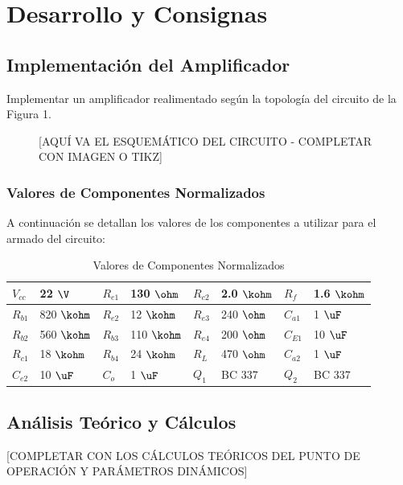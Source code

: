\chapter{Desarrollo y Consignas}

\section{Implementación del Amplificador}
Implementar un amplificador realimentado según la topología del circuito de la Figura 1.

\vspace{1cm}
\begin{figure}[H]
    \centering
    [AQUÍ VA EL ESQUEMÁTICO DEL CIRCUITO - COMPLETAR CON IMAGEN O TIKZ]
\end{figure}

\subsection{Valores de Componentes Normalizados}
A continuación se detallan los valores de los componentes a utilizar para el armado del circuito:

\begin{table}[H]
    \centering
    \begin{tabular}{|l|l||l|l||l|l||l|l|}
        \hline
        $V_{cc}$ & 22 $\V$ & $R_{e1}$ & 130 $\ohm$ & $R_{c2}$ & 2.0 $\kohm$ & $R_f$ & 1.6 $\kohm$ \\ \hline
        $R_{b1}$ & 820 $\kohm$ & $R_{e2}$ & 12 $\kohm$ & $R_{e3}$ & 240 $\ohm$ & $C_{a1}$ & 1 $\uF$ \\ \hline
        $R_{b2}$ & 560 $\kohm$ & $R_{b3}$ & 110 $\kohm$ & $R_{e4}$ & 200 $\ohm$ & $C_{E1}$ & 10 $\uF$ \\ \hline
        $R_{c1}$ & 18 $\kohm$ & $R_{b4}$ & 24 $\kohm$ & $R_L$ & 470 $\ohm$ & $C_{a2}$ & 1 $\uF$ \\ \hline
        $C_{e2}$ & 10 $\uF$ & $C_o$ & 1 $\uF$ & $Q_1$ & BC 337 & $Q_2$ & BC 337 \\ \hline
    \end{tabular}
    \caption{Valores de Componentes Normalizados}
    \label{tab:componentes}
\end{table}

\section{Análisis Teórico y Cálculos}
[COMPLETAR CON LOS CÁLCULOS TEÓRICOS DEL PUNTO DE OPERACIÓN Y PARÁMETROS DINÁMICOS]

